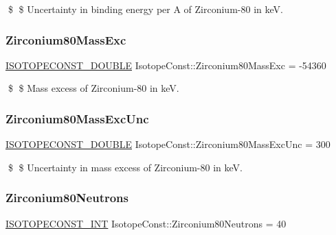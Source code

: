 \$ \$ Uncertainty in binding energy per A of Zirconium-\/80 in keV. \mbox{\label{group___isotope_const-_zirconium-_zr80_ga8489a4dc9129ebb7b4331c94ea06995b}} 
\subsubsection{\texorpdfstring{Zirconium80\+Mass\+Exc}{Zirconium80MassExc}}
{\footnotesize\ttfamily \mbox{\hyperlink{group___isotope_const-_macros_ga8f45a7272ce02c0b4c65c44636ed719a}{I\+S\+O\+T\+O\+P\+E\+C\+O\+N\+S\+T\+\_\+\+D\+O\+U\+B\+LE}} Isotope\+Const\+::\+Zirconium80\+Mass\+Exc = -\/54360}

\$ \$ Mass excess of Zirconium-\/80 in keV. \mbox{\label{group___isotope_const-_zirconium-_zr80_ga4ab3d6df406c160f8bb790fb4d3012a9}} 
\subsubsection{\texorpdfstring{Zirconium80\+Mass\+Exc\+Unc}{Zirconium80MassExcUnc}}
{\footnotesize\ttfamily \mbox{\hyperlink{group___isotope_const-_macros_ga8f45a7272ce02c0b4c65c44636ed719a}{I\+S\+O\+T\+O\+P\+E\+C\+O\+N\+S\+T\+\_\+\+D\+O\+U\+B\+LE}} Isotope\+Const\+::\+Zirconium80\+Mass\+Exc\+Unc = 300}

\$ \$ Uncertainty in mass excess of Zirconium-\/80 in keV. \mbox{\label{group___isotope_const-_zirconium-_zr80_gaae5a1c6b83ec6385f82de4f3098d882a}} 
\subsubsection{\texorpdfstring{Zirconium80\+Neutrons}{Zirconium80Neutrons}}
{\footnotesize\ttfamily \mbox{\hyperlink{group___isotope_const-_macros_ga5f18360b3e99483a35c32d789e62621c}{I\+S\+O\+T\+O\+P\+E\+C\+O\+N\+S\+T\+\_\+\+I\+NT}} Isotope\+Const\+::\+Zirconium80\+Neutrons = 40}

